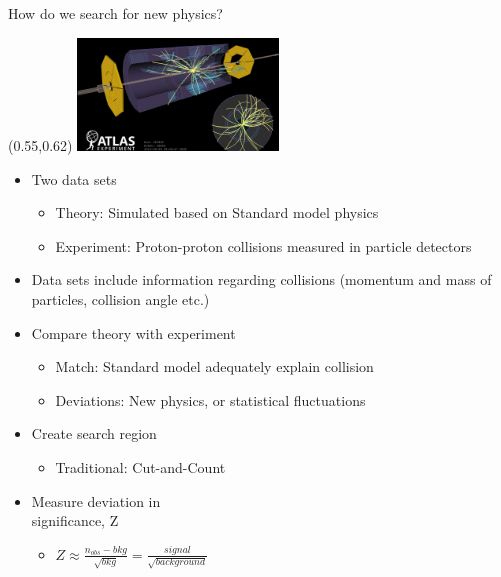 \documentclass[UKenglish]{beamer}
\begin{document}
\begin{frame}{How do we search for new physics?}
    \begin{textblock}{1}(0.55,0.62)
        \includegraphics[width=0.4\textwidth]{figures/Collisions.jpeg}
    \end{textblock}
    \begin{itemize}
        \item Two data sets 
        \begin{itemize}
            \item Theory: Simulated based on Standard model physics 
            \item Experiment: Proton-proton collisions measured in particle detectors
        \end{itemize}
        \item Data sets include information regarding collisions (momentum and mass of particles, collision angle etc.)
        \item Compare theory with experiment 
        \begin{itemize}
            \item Match: Standard model adequately explain collision
            \item Deviations: New physics, or statistical fluctuations 
        \end{itemize}
        \item Create search region
        \begin{itemize}
            \item Traditional: Cut-and-Count
        \end{itemize}
        \item Measure deviation in \\ significance, Z 
        \begin{itemize}
            \item $Z\approx \frac{n_{obs} - bkg}{\sqrt{bkg}} = \frac{signal}{\sqrt{background}}$
        \end{itemize}
    \end{itemize}

\end{frame}
\end{document}
